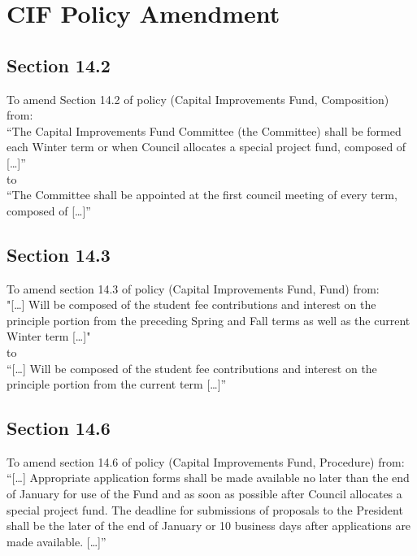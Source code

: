 \documentclass[12pt, letterpaper]{article}
\begin{document}
\section*{CIF Policy Amendment}

\subsection*{Section 14.2}
To amend Section 14.2 of policy (Capital Improvements Fund, Composition) from:\\

“The Capital Improvements Fund Committee (the Committee) shall be formed each Winter term or when Council allocates a special project fund, composed of […]”\\

to\\

“The Committee shall be appointed at the first council meeting of every term, composed of […]”

\subsection*{Section 14.3}
To amend section 14.3 of policy (Capital Improvements Fund, Fund) from:\\

"[…] Will be composed of the student fee contributions and interest on the principle portion from the preceding Spring and Fall terms as well as the current Winter term […]"\\

to\\

“[…] Will be composed of the student fee contributions and interest on the principle portion from the current term […]”

\subsection*{Section 14.6}
To amend section 14.6 of policy (Capital Improvements Fund, Procedure) from:\\

“[…] Appropriate application forms shall be made available no later than the end of January for use of the Fund and as soon as possible after Council allocates a special project fund. The deadline for submissions of proposals to the President shall be the later of the end of January or 10 business days after applications are made available. […]”\\
\end{document}
